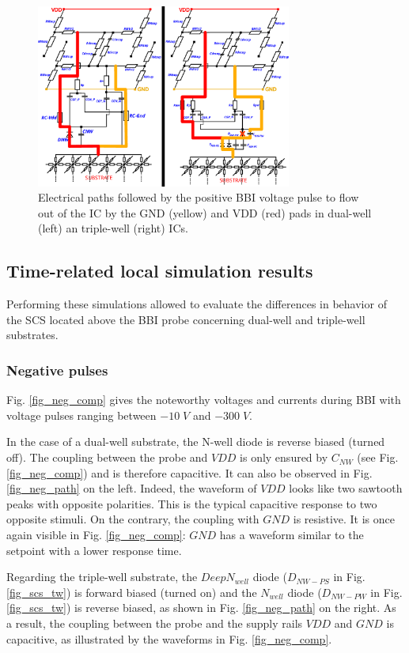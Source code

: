 \documentclass[10pt, conference, compsocconf]{IEEEtran}
\begin{document}
\begin{figure}[!ht]
\centering
\includegraphics[width=3.3in]{pos_path_comp.eps}
\caption{Electrical paths followed by the positive BBI voltage pulse to flow out of the IC by the GND (yellow) and VDD (red) pads in dual-well (left) an triple-well (right) ICs.}
\label{fig_pos_path}
\end{figure}

\subsection{Time-related local simulation results}
Performing these simulations allowed to evaluate the differences in behavior of the SCS located above the BBI probe concerning dual-well and triple-well substrates.

\subsubsection{Negative pulses}
Fig. \ref{fig_neg_comp} gives the noteworthy voltages and currents during BBI with voltage pulses ranging between $-10 \; V$ and $-300 \; V$.

In the case of a dual-well substrate, the N-well diode is reverse biased (turned off). The coupling between the probe and $VDD$ is only ensured by $C_{NW}$ (see Fig. \ref{fig_neg_comp}) and is therefore capacitive. It can also be observed in Fig. \ref{fig_neg_path} on the left. Indeed, the waveform of $VDD$ looks like two sawtooth peaks with opposite polarities. This is the typical capacitive response to two opposite stimuli. On the contrary, the coupling with $GND$ is resistive. It is once again visible in Fig. \ref{fig_neg_comp}: $GND$ has a waveform similar to the setpoint with a lower response time.

Regarding the triple-well substrate, the $Deep N_{well}$ diode ($D_{NW-PS}$ in Fig. \ref{fig_scs_tw}) is forward biased (turned on) and the $N_{well}$ diode ($D_{NW-PW}$ in Fig. \ref{fig_scs_tw}) is reverse biased, as shown in Fig. \ref{fig_neg_path} on the right. As a result, the coupling between the probe and the supply rails $VDD$ and $GND$ is capacitive, as illustrated by the waveforms in Fig. \ref{fig_neg_comp}.
\end{document}
